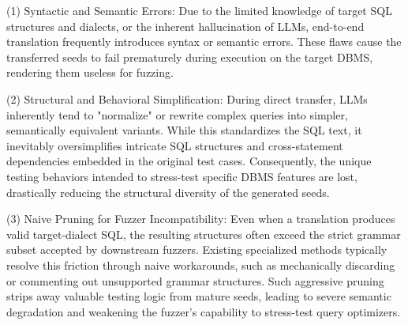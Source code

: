 
(1) Syntactic and Semantic Errors: Due to the limited knowledge of target SQL structures and dialects, or the inherent hallucination of LLMs, end-to-end translation frequently introduces syntax or semantic errors. These flaws cause the transferred seeds to fail prematurely during execution on the target DBMS, rendering them useless for fuzzing.

(2) Structural and Behavioral Simplification: During direct transfer, LLMs inherently tend to "normalize" or rewrite complex queries into simpler, semantically equivalent variants. While this standardizes the SQL text, it inevitably oversimplifies intricate SQL structures and cross-statement dependencies embedded in the original test cases. Consequently, the unique testing behaviors intended to stress-test specific DBMS features are lost, drastically reducing the structural diversity of the generated seeds.

(3) Naive Pruning for Fuzzer Incompatibility: Even when a translation produces valid target-dialect SQL, the resulting structures often exceed the strict grammar subset accepted by downstream fuzzers. Existing specialized methods typically resolve this friction through naive workarounds, such as mechanically discarding or commenting out unsupported grammar structures. Such aggressive pruning strips away valuable testing logic from mature seeds, leading to severe semantic degradation and weakening the fuzzer's capability to stress-test query optimizers.

